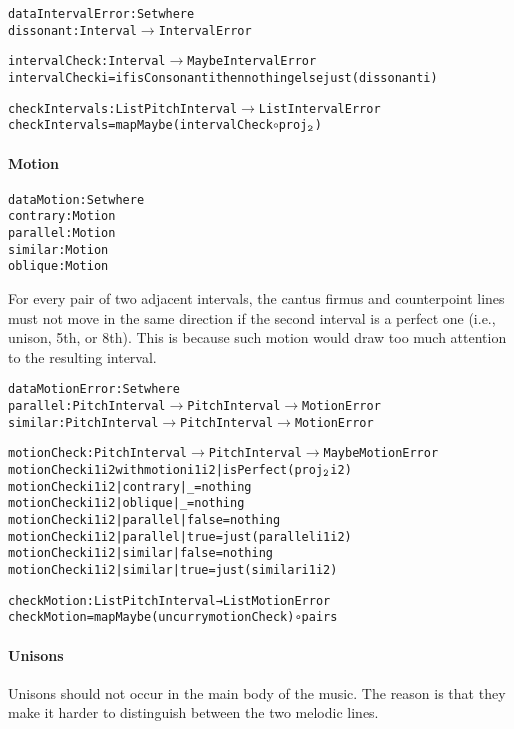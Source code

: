 \begin{alltt}
data IntervalError : Set where
  dissonant : Interval \(\rightarrow\) IntervalError

intervalCheck : Interval \(\rightarrow\) Maybe IntervalError
intervalCheck i = if isConsonant i then nothing else just (dissonant i)

checkIntervals : List PitchInterval \(\rightarrow\) List IntervalError
checkIntervals = mapMaybe (intervalCheck \(\circ\) proj\(\sb{\mathtt{2}}\))
\end{alltt}

\paragraph{Motion}

\begin{alltt}
data Motion : Set where
contrary : Motion
parallel : Motion
similar  : Motion
oblique  : Motion
\end{alltt}

For every pair of two adjacent intervals, the cantus firmus and
counterpoint lines must not move in the same direction if the second
interval is a perfect one (i.e., unison, 5th, or 8th).
This is because such motion would draw too much attention to the
resulting interval.

\begin{alltt}
data MotionError : Set where
  parallel : PitchInterval \(\rightarrow\) PitchInterval \(\rightarrow\) MotionError
  similar  : PitchInterval \(\rightarrow\) PitchInterval \(\rightarrow\) MotionError

motionCheck : PitchInterval \(\rightarrow\) PitchInterval \(\rightarrow\) Maybe MotionError
motionCheck i1 i2 with motion i1 i2 | isPerfect (proj\(\sb{\mathtt{2}}\) i2)
motionCheck i1 i2 | contrary | \_     = nothing
motionCheck i1 i2 | oblique  | \_     = nothing
motionCheck i1 i2 | parallel | false = nothing
motionCheck i1 i2 | parallel | true  = just (parallel i1 i2)
motionCheck i1 i2 | similar  | false = nothing
motionCheck i1 i2 | similar  | true  = just (similar i1 i2)

checkMotion : List PitchInterval → List MotionError
checkMotion = mapMaybe (uncurry motionCheck) ∘ pairs  
\end{alltt}

\paragraph{Unisons}
Unisons should not occur in the main body of the music.
The reason is that they make it harder to distinguish between
the two melodic lines.

